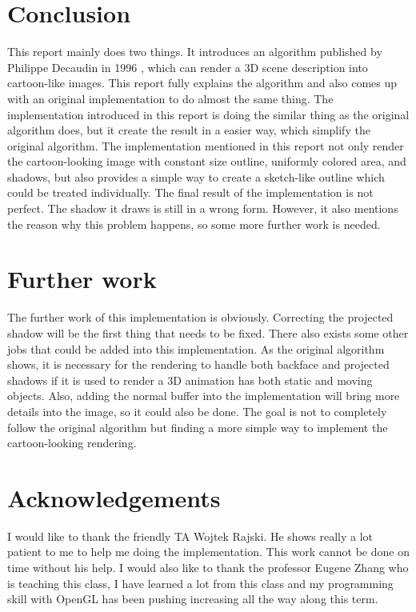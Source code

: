 \documentclass{acmsiggraph}               %
\begin{document}
\section{Conclusion}
\label{sec:conclusion}
This report mainly does two things. It introduces an algorithm published by Philippe Decaudin in 1996 \cite{Decaudin:1996:CLR}, which can render a 3D scene description into cartoon-like images. This report fully explains the algorithm and also comes up with an original implementation to do almost the same thing. The implementation introduced in this report is doing the similar thing as the original algorithm does, but it create the result in a easier way, which simplify the original algorithm. The implementation mentioned in this report not only render the cartoon-looking image with constant size outline, uniformly colored area, and shadows, but also provides a simple way to create a sketch-like outline which could be treated individually. The final result of the implementation is not  perfect. The shadow it draws is  still in a wrong form. However, it also mentions the reason why this problem happens, so some more further work is needed.
\section{Further work}
\label{sec:further}
The further work of this implementation is obviously. Correcting the projected shadow will be the first thing that needs to be fixed. There also exists some other jobs that could be added into this implementation. As the original algorithm shows, it is necessary for the rendering to handle both backface and projected shadows if it is used to render a 3D animation has both static and moving objects. Also, adding the normal buffer into the implementation will bring more details into the image, so it could also be done. The goal is not to completely follow the original algorithm but finding a more simple way to implement the cartoon-looking rendering.
\section*{Acknowledgements}

I would like to thank the friendly TA Wojtek Rajski. He shows really a lot patient to me to help me doing the implementation. This work cannot be done on time without his help. I would also like to thank the professor Eugene Zhang who is teaching this class, I have learned a lot from this class and my programming skill with OpenGL has been pushing increasing all the way along this term.




\nocite{*}

\end{document}
